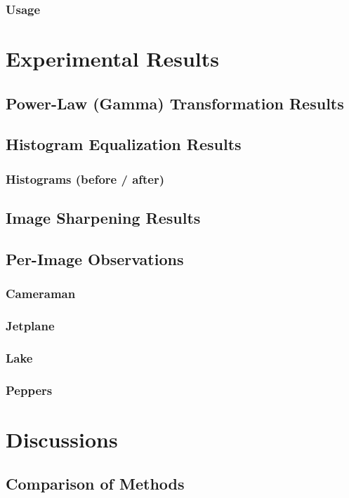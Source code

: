 \documentclass[12pt,a4paper]{article}
\begin{document}
\subsubsection{Usage} %

\section{Experimental Results} %
\subsection{Power-Law (Gamma) Transformation Results}
\subsection{Histogram Equalization Results}
\subsubsection{Histograms (before / after)}
\subsection{Image Sharpening Results}
\subsection{Per-Image Observations}
\subsubsection{Cameraman}
\subsubsection{Jetplane}
\subsubsection{Lake}
\subsubsection{Peppers}

\section{Discussions} %
\subsection{Comparison of Methods} %
\end{document}

